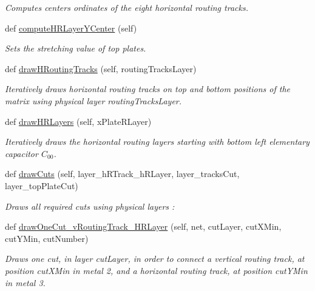 \begin{DoxyCompactItemize}
\begin{DoxyCompactList}\small\item\em Computes centers\textquotesingle{} ordinates of the eight horizontal routing tracks. \end{DoxyCompactList}\item 
def \mbox{\hyperlink{classpython_1_1capacitorrouted_1_1RoutMatchedCapacitor_a71bee512b44ecf046fc420bf5040fb89}{compute\+H\+R\+Layer\+Y\+Center}} (self)
\begin{DoxyCompactList}\small\item\em Sets the stretching value of top plates. \end{DoxyCompactList}\item 
def \mbox{\hyperlink{classpython_1_1capacitorrouted_1_1RoutMatchedCapacitor_a7c8e64a89e225c861bc65ec8e8634df9}{draw\+H\+Routing\+Tracks}} (self, routing\+Tracks\+Layer)
\begin{DoxyCompactList}\small\item\em Iteratively draws horizontal routing tracks on top and bottom positions of the matrix using physical layer {\ttfamily routing\+Tracks\+Layer}. \end{DoxyCompactList}\item 
def \mbox{\hyperlink{classpython_1_1capacitorrouted_1_1RoutMatchedCapacitor_aea5cf7e1dc273d8e1dc45e5f4d421f79}{draw\+H\+R\+Layers}} (self, x\+Plate\+R\+Layer)
\begin{DoxyCompactList}\small\item\em Iteratively draws the horizontal routing layers starting with bottom left elementary capacitor $ C_{00} $. \end{DoxyCompactList}\item 
def \mbox{\hyperlink{classpython_1_1capacitorrouted_1_1RoutMatchedCapacitor_a0d91006a08de265233844aa7d305d4d5}{draw\+Cuts}} (self, layer\+\_\+h\+R\+Track\+\_\+h\+R\+Layer, layer\+\_\+tracks\+Cut, layer\+\_\+top\+Plate\+Cut)
\begin{DoxyCompactList}\small\item\em Draws all required cuts using physical layers \+: \end{DoxyCompactList}\item 
def \mbox{\hyperlink{classpython_1_1capacitorrouted_1_1RoutMatchedCapacitor_a974575dc937c28e440dd0a252c7ef4b7}{draw\+One\+Cut\+\_\+v\+Routing\+Track\+\_\+\+H\+R\+Layer}} (self, net, cut\+Layer, cut\+X\+Min, cut\+Y\+Min, cut\+Number)
\begin{DoxyCompactList}\small\item\em Draws one cut, in layer {\ttfamily cut\+Layer}, in order to connect a vertical routing track, at position {\ttfamily cut\+X\+Min} in metal 2, and a horizontal routing track, at position {\ttfamily cut\+Y\+Min} in metal 3. \end{DoxyCompactList}\item 

\end{DoxyCompactItemize}
